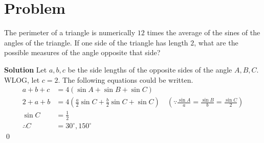 \documentclass{article}
\newenvironment{solution}{\begin{trivlist}\item[]{\bf Solution}}{\qed \end{trivlist}}
\begin{document}
\section*{Problem}
The perimeter of a triangle is numerically $12$ times the average of the sines of the angles of the triangle. If one side of the triangle has length $2$, what are the possible measures of the angle opposite that side?
\begin{solution}
Let $a, b, c$ be the side lengths of the opposite sides of the angle $A, B, C$. WLOG, let $c = 2$. The following equations could be written.
\begin{align*}
    a + b + c &= 4(\sin A + \sin B + \sin C) \\
    2 + a + b &= 4 \left( \frac{a}{2} \sin C + \frac{b}{2} \sin C + \sin C \right) \quad \left( \because \frac{\sin A}{a} = \frac{\sin B}{b} = \frac{\sin C}{2} \right) \\
    \sin C &= \frac{1}{2} \\
    \therefore C &= \boxed{30^\circ, 150^\circ}
\end{align*}
\end{solution}

\newpage
\end{document}
